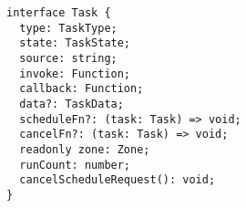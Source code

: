 \begin{verbatim}
interface Task {
  type: TaskType;
  state: TaskState;
  source: string;
  invoke: Function;
  callback: Function;
  data?: TaskData;
  scheduleFn?: (task: Task) => void;
  cancelFn?: (task: Task) => void;
  readonly zone: Zone;
  runCount: number;
  cancelScheduleRequest(): void;
}
\end{verbatim}
